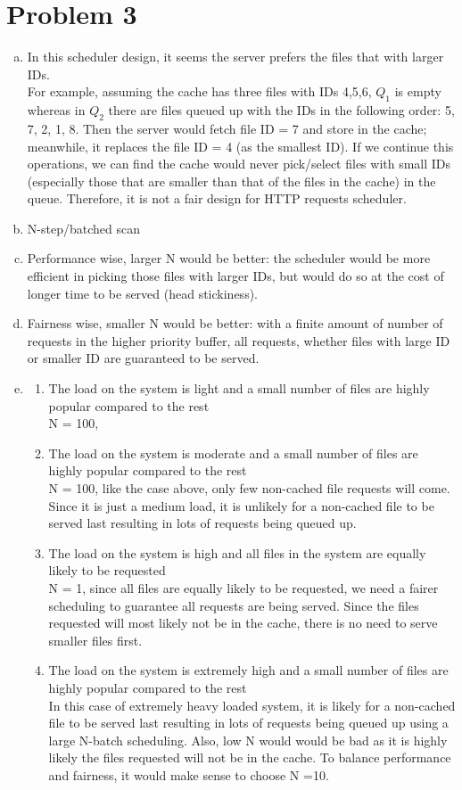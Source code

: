 \documentclass{article}   	                         %
\begin{document}
\section*{Problem 3}
\begin{enumerate}[(a)]
\item
In this scheduler design, it seems the server prefers the files that with larger IDs.\\
For example, assuming the cache has three files with IDs 4,5,6, $Q_1$ is empty whereas in $Q_2$ there are files queued up with the IDs in the following order:  5, 7, 2, 1, 8. Then the server would fetch file ID = 7 and store in the cache; meanwhile, it replaces the file ID = 4 (as the smallest ID). If we continue this operations, we can find the cache would never pick/select files with small IDs (especially those that are smaller than that of the files in the cache) in the queue. Therefore, it is not a fair design for HTTP requests scheduler.
\item
N-step/batched scan
\item
Performance wise, larger N would be better: the scheduler would be more efficient in picking those files with larger IDs, but would do so at the cost of longer time to be served (head stickiness).
\item
Fairness wise, smaller N would be better: with a finite amount of number of requests in the higher priority buffer, all requests, whether files with large ID or smaller ID are guaranteed to be served.
\item
\begin{enumerate}[1.]
\item The load on the system is light and a small number of files are highly popular compared to the rest\\
N = 100,  
\item The load on the system is moderate and a small number of files are highly popular compared to the rest\\
N = 100, like the case above, only few non-cached file requests will come. Since it is just a medium load, it is unlikely for a non-cached file to be served last resulting in lots of requests being queued up.
\item The load on the system is high and all files in the system are equally likely to be requested\\
N = 1, since all files are equally likely to be requested, we need a fairer scheduling to guarantee all requests are being served. Since the files requested will most likely not be in the cache, there is no need to serve smaller files first.
\item The load on the system is extremely high and a small number of files are highly popular compared to the rest\\
In this case of extremely heavy loaded system, it is likely for a non-cached file to be served last resulting in lots of requests being queued up using a large N-batch scheduling. Also, low N would would be bad as it is highly likely the files requested will not be in the cache. To balance performance and fairness, it would make sense to choose N =10.
\end{enumerate}
\end{enumerate}
\end{document}
